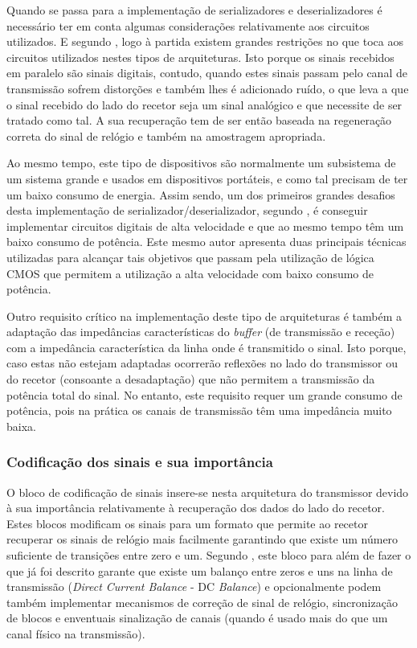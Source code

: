 Quando se passa para a implementação de serializadores e deserializadores é necessário ter em conta algumas considerações relativamente aos circuitos utilizados. E segundo \cite{R012}, logo à partida existem grandes restrições no que toca aos circuitos utilizados nestes tipos de arquiteturas. Isto porque os sinais recebidos em paralelo são sinais digitais, contudo, quando estes sinais passam pelo canal de transmissão sofrem distorções e também lhes é adicionado ruído, o que leva a que o sinal recebido do lado do recetor seja um sinal analógico e que necessite de ser tratado como tal. A sua recuperação tem de ser então baseada na regeneração correta do sinal de relógio e também na amostragem apropriada. 
	
Ao mesmo tempo, este tipo de dispositivos são normalmente um subsistema de um sistema grande e usados em dispositivos portáteis, e como tal precisam de ter um baixo consumo de energia. Assim sendo, um dos primeiros grandes desafios desta implementação de serializador/deserializador, segundo \cite{R012}, é conseguir implementar circuitos digitais de alta velocidade e que ao mesmo tempo têm um baixo consumo de potência. Este mesmo autor apresenta duas principais técnicas utilizadas para alcançar tais objetivos que passam pela utilização de lógica CMOS que permitem a utilização a alta velocidade com baixo consumo de potência. 
	
Outro requisito crítico na implementação deste tipo de arquiteturas é também a adaptação das impedâncias características do \textit{buffer} (de transmissão e receção) com a impedância característica da linha onde é transmitido o sinal. Isto porque, caso estas não estejam adaptadas ocorrerão reflexões no lado do transmissor ou do recetor (consoante a desadaptação) que não permitem a transmissão da potência total do sinal. No entanto, este requisito requer um grande consumo de potência, pois na prática os canais de transmissão têm uma impedância muito baixa. 


\subsubsection*{Codificação dos sinais e sua importância} \label{subsub:cod_impor}

O bloco de codificação de sinais insere-se nesta arquitetura do transmissor devido à sua importância relativamente à recuperação dos dados do lado do recetor. Estes blocos modificam os sinais para um formato que permite ao recetor recuperar os sinais de relógio mais facilmente garantindo que existe um número suficiente de transições entre zero e um. Segundo \cite{R032}, este bloco para além de fazer o que já foi descrito garante que existe um balanço entre zeros e uns na linha de transmissão (\textit{Direct Current Balance} - DC \textit{Balance}) e opcionalmente podem também implementar mecanismos de correção de sinal de relógio, sincronização de blocos e enventuais sinalização de canais (quando é usado mais do que um canal físico na transmissão).

